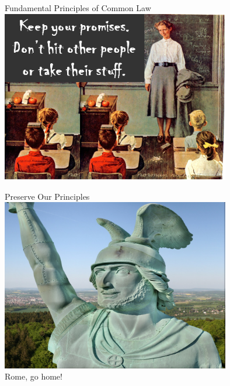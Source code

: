 \begin{frame}{Fundamental Principles of Common Law}
    \centering
    \includegraphics[width=0.75\textwidth]{img/schoolroom.png} \\
\end{frame}

\begin{frame}{Preserve Our Principles}
    \centering
    \includegraphics[width=0.75\textwidth]{img/herman3.png} \\
    Rome, go home! \\
\end{frame}

